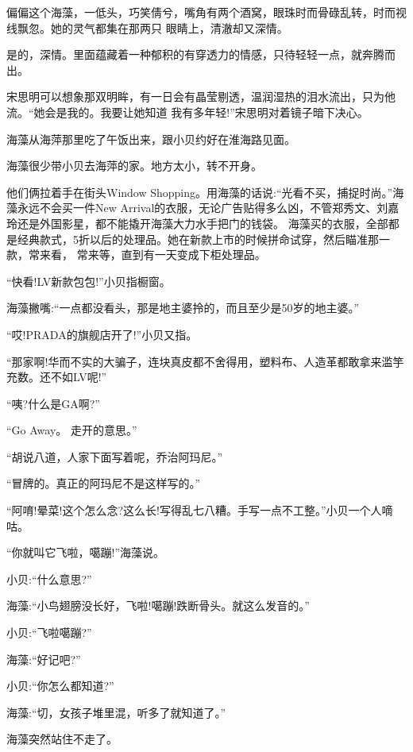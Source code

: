 \documentclass[11pt,a4paper,onecolumn]{article}
\begin{document}
偏偏这个海藻，一低头，巧笑倩兮，嘴角有两个酒窝，眼珠时而骨碌乱转，时而视线飘忽。她的灵气都集在那两只
眼睛上，清澈却又深情。

是的，深情。里面蕴藏着一种郁积的有穿透力的情感，只待轻轻一点，就奔腾而出。

宋思明可以想象那双明眸，有一日会有晶莹剔透，温润湿热的泪水流出，只为他流。``她会是我的。我要让她知道
我有多年轻!''宋思明对着镜子暗下决心。

海藻从海萍那里吃了午饭出来，跟小贝约好在淮海路见面。

海藻很少带小贝去海萍的家。地方太小，转不开身。

他们俩拉着手在街头Window Shopping。用海藻的话说:``光看不买，捕捉时尚。''海藻永远不会买一件New
Arrival的衣服，无论广告贴得多么凶，不管郑秀文、刘嘉玲还是外国影星，都不能撬开海藻大力水手把门的钱袋。
海藻买的衣服，全部都是经典款式，5折以后的处理品。她在新款上市的时候拼命试穿，然后瞄准那一款，常来看，
常来等，直到有一天变成下柜处理品。

``快看!LV新款包包!''小贝指橱窗。

海藻撇嘴:``一点都没看头，那是地主婆拎的，而且至少是50岁的地主婆。''

``哎!PRADA的旗舰店开了!''小贝又指。

``那家啊!华而不实的大骗子，连块真皮都不舍得用，塑料布、人造革都敢拿来滥竽充数。还不如LV呢!''

``咦?什么是GA啊?''

``Go Away。 走开的意思。''

``胡说八道，人家下面写着呢，乔治阿玛尼。''

``冒牌的。真正的阿玛尼不是这样写的。''

``阿唷!晕菜!这个怎么念?这么长!写得乱七八糟。手写一点不工整。''小贝一个人嘀咕。

``你就叫它飞啦，噶蹦!''海藻说。

小贝:``什么意思?''

海藻:``小鸟翅膀没长好，飞啦!噶蹦!跌断骨头。就这么发音的。''

小贝:``飞啦噶蹦?''

海藻:``好记吧?''

小贝:``你怎么都知道?''

海藻:``切，女孩子堆里混，听多了就知道了。''

海藻突然站住不走了。

\section[\thesection]{}
\end{document}
